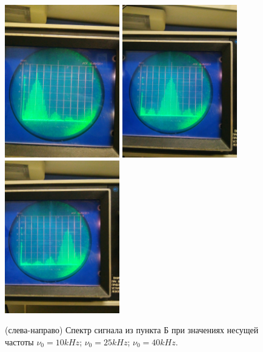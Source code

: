 \documentclass[a4paper,12pt]{article}
\begin{document}
\begin{figure}[tpb]
\centering
\includegraphics[width=50mm]{Pictures/B2-b10.jpg}
\includegraphics[width=50mm]{Pictures/B2-b25.jpg}
\includegraphics[width=50mm]{Pictures/B2-b40.jpg}
\caption{(слева-направо) Спектр сигнала из пункта Б при значениях несущей частоты      $\nu_0 = 10 kHz$; $\nu_0 = 25 kHz$; $\nu_0 = 40 kHz$.}
\label{B_2b}
\end{figure}
\end{document}

